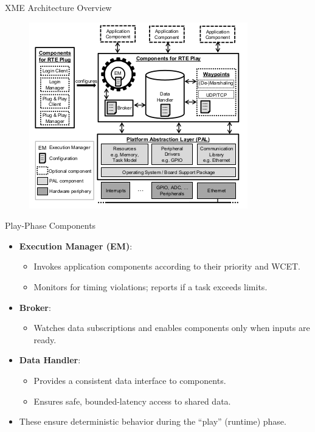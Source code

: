 \documentclass{beamer}
\begin{document}
\begin{frame}{XME Architecture Overview}
  \begin{figure}
      \centering
      \includegraphics[width=0.6\linewidth]{XME_architecture.png}
  \end{figure}
\end{frame}

\begin{frame}{Play-Phase Components}
  \begin{itemize}
    \item \textbf{Execution Manager (EM)}:
    \begin{itemize}
      \item Invokes application components according to their priority and WCET.
      \item Monitors for timing violations; reports if a task exceeds limits.
    \end{itemize}
    \item \textbf{Broker}:
    \begin{itemize}
      \item Watches data subscriptions and enables components only when inputs are ready.
    \end{itemize}
    \item \textbf{Data Handler}:
    \begin{itemize}
      \item Provides a consistent data interface to components.
      \item Ensures safe, bounded-latency access to shared data.
    \end{itemize}
    \item These ensure deterministic behavior during the “play” (runtime) phase.
  \end{itemize}
\end{frame}
\end{document}
